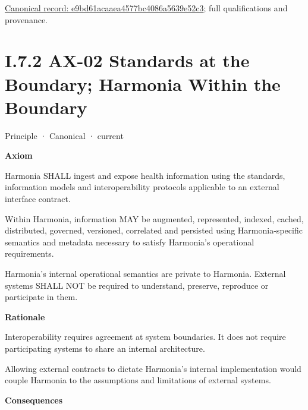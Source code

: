 {\footnotesize \href{../../../../continuum/motivation/principle/e9bd61acaaea4577bc4086a5639e52c3.md}{Canonical record: e9bd61acaaea4577bc4086a5639e52c3}; full qualifications and provenance.}\par
\section*{I.7.2 AX-02 Standards at the Boundary; Harmonia Within the Boundary}
\label{navigation:I.7.2}

\label{element:eee8c3783d964d18a7f9dcea85fcd4cf}
{\small Principle · Canonical · current}\par

\par\medskip\textbf{Axiom}\par


Harmonia SHALL ingest and expose health information using the standards,
information models and interoperability protocols applicable to an
external interface contract.



Within Harmonia, information MAY be augmented, represented, indexed,
cached, distributed, governed, versioned, correlated and persisted using
Harmonia-specific semantics and metadata necessary to satisfy Harmonia's
operational requirements.



Harmonia's internal operational semantics are private to Harmonia.
External systems SHALL NOT be required to understand, preserve,
reproduce or participate in them.



\par\medskip\textbf{Rationale}\par


Interoperability requires agreement at system boundaries. It does not
require participating systems to share an internal architecture.



Allowing external contracts to dictate Harmonia's internal
implementation would couple Harmonia to the assumptions and limitations
of external systems.



\par\medskip\textbf{Consequences}\par



